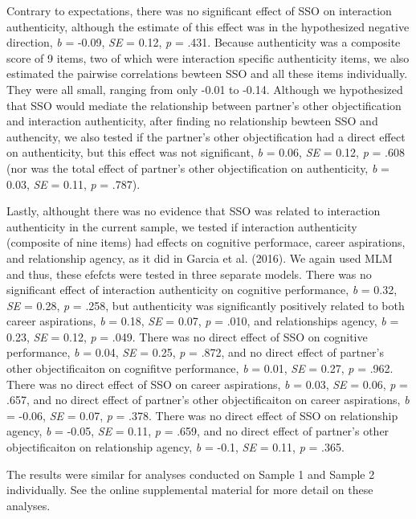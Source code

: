 \documentclass[man]{apa6}
\begin{document}
Contrary to expectations, there was no significant effect of SSO on
interaction authenticity, although the estimate of this effect was in
the hypothesized negative direction, \emph{b} = -0.09, \emph{SE} = 0.12,
\emph{p} = .431. Because authenticity was a composite score of 9 items,
two of which were interaction specific authenticity items, we also
estimated the pairwise correlations bewteen SSO and all these items
individually. They were all small, ranging from only -0.01 to -0.14.
Although we hypothesized that SSO would mediate the relationship between
partner's other objectification and interaction authenticity, after
finding no relationship bewteen SSO and authencity, we also tested if
the partner's other objectification had a direct effect on authenticity,
but this effect was not significant, \emph{b} = 0.06, \emph{SE} = 0.12,
\emph{p} = .608 (nor was the total effect of partner's other
objectification on authenticity, \emph{b} = 0.03, \emph{SE} = 0.11,
\emph{p} = .787).

Lastly, althought there was no evidence that SSO was related to
interaction authenticity in the current sample, we tested if interaction
authenticity (composite of nine items) had effects on cognitive
performace, career aspirations, and relationship agency, as it did in
Garcia et al. (2016). We again used MLM and thus, these efefcts were
tested in three separate models. There was no significant effect of
interaction authenticity on cognitive performance, \emph{b} = 0.32,
\emph{SE} = 0.28, \emph{p} = .258, but authenticity was significantly
positively related to both career aspirations, \emph{b} = 0.18,
\emph{SE} = 0.07, \emph{p} = .010, and relationships agency, \emph{b} =
0.23, \emph{SE} = 0.12, \emph{p} = .049. There was no direct effect of
SSO on cognitive performance, \emph{b} = 0.04, \emph{SE} = 0.25,
\emph{p} = .872, and no direct effect of partner's other objectificaiton
on cognifitve performance, \emph{b} = 0.01, \emph{SE} = 0.27, \emph{p} =
.962. There was no direct effect of SSO on career aspirations, \emph{b}
= 0.03, \emph{SE} = 0.06, \emph{p} = .657, and no direct effect of
partner's other objectificaiton on career aspirations, \emph{b} = -0.06,
\emph{SE} = 0.07, \emph{p} = .378. There was no direct effect of SSO on
relationship agency, \emph{b} = -0.05, \emph{SE} = 0.11, \emph{p} =
.659, and no direct effect of partner's other objectificaiton on
relationship agency, \emph{b} = -0.1, \emph{SE} = 0.11, \emph{p} = .365.

The results were similar for analyses conducted on Sample 1 and Sample 2
individually. See the online supplemental material for more detail on
these analyses.
\end{document}
